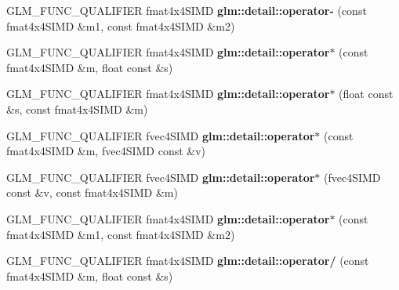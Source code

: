 \begin{DoxyCompactItemize}
\item 
\hypertarget{namespaceglm_1_1detail_a00972f91f088e7ab0f96ebdc6e8bec41}{G\-L\-M\-\_\-\-F\-U\-N\-C\-\_\-\-Q\-U\-A\-L\-I\-F\-I\-E\-R fmat4x4\-S\-I\-M\-D {\bfseries glm\-::detail\-::operator-\/} (const fmat4x4\-S\-I\-M\-D \&m1, const fmat4x4\-S\-I\-M\-D \&m2)}\label{namespaceglm_1_1detail_a00972f91f088e7ab0f96ebdc6e8bec41}

\item 
\hypertarget{namespaceglm_1_1detail_a56fc3932025be61fb9a7cb14005c0d00}{G\-L\-M\-\_\-\-F\-U\-N\-C\-\_\-\-Q\-U\-A\-L\-I\-F\-I\-E\-R fmat4x4\-S\-I\-M\-D {\bfseries glm\-::detail\-::operator$\ast$} (const fmat4x4\-S\-I\-M\-D \&m, float const \&s)}\label{namespaceglm_1_1detail_a56fc3932025be61fb9a7cb14005c0d00}

\item 
\hypertarget{namespaceglm_1_1detail_a8ab387a0948c211143bbb41dd8fda30c}{G\-L\-M\-\_\-\-F\-U\-N\-C\-\_\-\-Q\-U\-A\-L\-I\-F\-I\-E\-R fmat4x4\-S\-I\-M\-D {\bfseries glm\-::detail\-::operator$\ast$} (float const \&s, const fmat4x4\-S\-I\-M\-D \&m)}\label{namespaceglm_1_1detail_a8ab387a0948c211143bbb41dd8fda30c}

\item 
\hypertarget{namespaceglm_1_1detail_a8ba6a9d268faa4277d6734a2da036c4d}{G\-L\-M\-\_\-\-F\-U\-N\-C\-\_\-\-Q\-U\-A\-L\-I\-F\-I\-E\-R fvec4\-S\-I\-M\-D {\bfseries glm\-::detail\-::operator$\ast$} (const fmat4x4\-S\-I\-M\-D \&m, fvec4\-S\-I\-M\-D const \&v)}\label{namespaceglm_1_1detail_a8ba6a9d268faa4277d6734a2da036c4d}

\item 
\hypertarget{namespaceglm_1_1detail_a0f6596e928f7dc3fb62a38bb5df08d18}{G\-L\-M\-\_\-\-F\-U\-N\-C\-\_\-\-Q\-U\-A\-L\-I\-F\-I\-E\-R fvec4\-S\-I\-M\-D {\bfseries glm\-::detail\-::operator$\ast$} (fvec4\-S\-I\-M\-D const \&v, const fmat4x4\-S\-I\-M\-D \&m)}\label{namespaceglm_1_1detail_a0f6596e928f7dc3fb62a38bb5df08d18}

\item 
\hypertarget{namespaceglm_1_1detail_a628d3f0d2c16d6207ca18a11ad66261c}{G\-L\-M\-\_\-\-F\-U\-N\-C\-\_\-\-Q\-U\-A\-L\-I\-F\-I\-E\-R fmat4x4\-S\-I\-M\-D {\bfseries glm\-::detail\-::operator$\ast$} (const fmat4x4\-S\-I\-M\-D \&m1, const fmat4x4\-S\-I\-M\-D \&m2)}\label{namespaceglm_1_1detail_a628d3f0d2c16d6207ca18a11ad66261c}

\item 
\hypertarget{namespaceglm_1_1detail_aa8f3ac302faac4a9d5c0e49321ccf9cb}{G\-L\-M\-\_\-\-F\-U\-N\-C\-\_\-\-Q\-U\-A\-L\-I\-F\-I\-E\-R fmat4x4\-S\-I\-M\-D {\bfseries glm\-::detail\-::operator/} (const fmat4x4\-S\-I\-M\-D \&m, float const \&s)}\label{namespaceglm_1_1detail_aa8f3ac302faac4a9d5c0e49321ccf9cb}


\end{DoxyCompactItemize}
